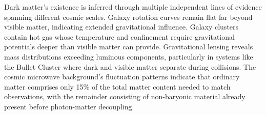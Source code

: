 Dark matter's existence is inferred through multiple independent lines of evidence spanning different cosmic scales. Galaxy rotation curves remain flat far beyond visible matter, indicating extended gravitational influence. Galaxy clusters contain hot gas whose temperature and confinement require gravitational potentials deeper than visible matter can provide. Gravitational lensing reveals mass distributions exceeding luminous components, particularly in systems like the Bullet Cluster where dark and visible matter separate during collisions. The cosmic microwave background's fluctuation patterns indicate that ordinary matter comprises only 15\% of the total matter content needed to match observations, with the remainder consisting of non-baryonic material already present before photon-matter decoupling.
